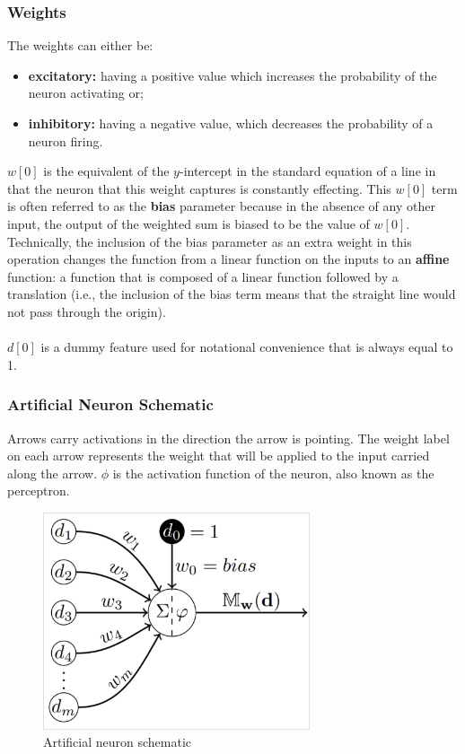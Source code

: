 \documentclass[a4paper,11pt]{article}
\begin{document}
\subsubsection{Weights}
The weights can either be:
\begin{itemize}
    \item   \textbf{excitatory:} having a positive value which increases the probability of the neuron activating or;
    \item   \textbf{inhibitory:} having a negative value, which decreases the probability of a neuron firing.
\end{itemize}

$w[0]$ is the equivalent of the $y$-intercept in the standard equation of a line in that the neuron that this weight captures is constantly effecting.
This $w[0]$ term is often referred to as the \textbf{bias} parameter because in the absence of any other input, the output of the weighted sum is biased to be the value of $w[0]$.
Technically, the inclusion of the bias parameter as an extra weight in this operation changes the function from a linear function on the inputs to an \textbf{affine} function: a function that is composed of a linear function followed by a translation (i.e., the inclusion of the bias term means that the straight line would not pass through the origin).
\\\\
$d[0]$ is a dummy feature used for notational convenience that is always equal to 1.

\subsubsection{Artificial Neuron Schematic}
Arrows carry activations in the direction the arrow is pointing.
The weight label on each arrow represents the weight that will be applied to the input carried along the arrow.
$\phi$ is the activation function of the neuron, also known as the perceptron.

\begin{figure}[H]
    \centering
    \includegraphics[width=0.7\textwidth]{images/schematic.png}
    \caption{ Artificial neuron schematic }
\end{figure}
\end{document}

